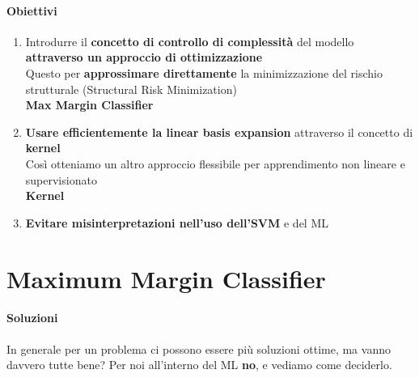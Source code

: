 \documentclass[10pt]{book}
\begin{document}
\paragraph{Obiettivi} \begin{enumerate}
	\item Introdurre il \textbf{concetto di controllo di complessità} del modello \textbf{attraverso un approccio di ottimizzazione}\\
	Questo per \textbf{approssimare direttamente} la minimizzazione del rischio strutturale (Structural Risk Minimization)\\
	\textbf{Max Margin Classifier}
	\item \textbf{Usare efficientemente la linear basis expansion} attraverso il concetto di \textbf{kernel}\\
	Così otteniamo un altro approccio flessibile per apprendimento non lineare e supervisionato\\
	\textbf{Kernel}
	\item \textbf{Evitare misinterpretazioni nell'uso dell'SVM} e del ML
\end{enumerate}
\section{Maximum Margin Classifier}
\paragraph{Soluzioni} In generale per un problema ci possono essere più soluzioni ottime, ma vanno davvero tutte bene? Per noi all'interno del ML \textbf{no}, e vediamo come deciderlo.
\pagebreak
\end{document}
